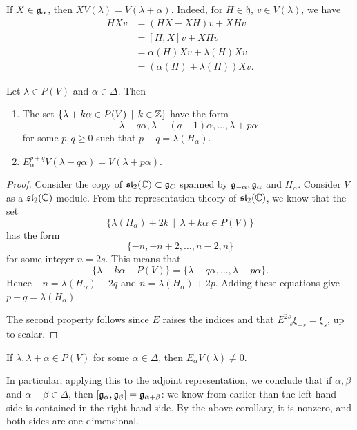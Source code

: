 \documentclass[11pt, english]{article}
\begin{document}
If $X \in \mathfrak g_\alpha$, then $XV(\lambda) = V(\lambda+\alpha)$. Indeed, for $H \in \mathfrak h$, $v \in V(\lambda)$, we have
\begin{align*}
 HXv &= (HX-XH)v+XHv \\
&= [H,X]v + XHv \\
&= \alpha(H)Xv + \lambda(H)Xv \\
&= (\alpha(H)+\lambda(H))Xv.
\end{align*}
\begin{prop}
 Let $\lambda \in P(V)$ and $\alpha \in \Delta$. Then
 \begin{enumerate}
 \item The set $\{ \lambda + k \alpha \in P(V) \, \mid \, k \in \mathbb{Z} \}$ have the form
$$
\lambda-q\alpha, \lambda-(q-1)\alpha,\ldots, \lambda+p\alpha
$$
for some $p,q \geq 0$ such that $p-q=\lambda(H_\alpha)$. 
\item $E_\alpha^{p+q} V(\lambda-q\alpha) = V(\lambda + p\alpha)$.
 \end{enumerate}
\end{prop}
\begin{proof}
  Consider the copy of $\mathfrak{sl}_2(\mathbb{C}) \subset \mathfrak g_C$ spanned by $\mathfrak g_{-\alpha},\mathfrak g_\alpha$ and $H_\alpha$. Consider $V$ as a $\mathfrak{sl}_2(\mathbb{C})$-module. From the representation theory of $\mathfrak{sl}_2(\mathbb{C})$, we know that the set 
$$
\{
\lambda(H_\alpha) + 2k \, \mid \, \lambda+k\alpha \in P(V) 
\}
$$
has the form 
$$
\{-n, -n+2, \ldots, n-2, n \}
$$
for some integer $n=2s$. This means that
$$
\{ \lambda  + k \alpha \, \mid \, P(V) \} = \{ \lambda - q\alpha, \ldots, \lambda+p\alpha \}.
$$
Hence $-n=\lambda(H_\alpha)-2q$ and $n=\lambda(H_\alpha)+2p$. Adding these equations give $p-q=\lambda(H_\alpha)$. 

The second property follows since $E$ raises the indices and that $E^{2s}_{-s} \xi_{-s}= \xi_s$, up to scalar.
\end{proof}

\begin{corr}
  If $\lambda, \lambda+\alpha \in P(V)$ for some $\alpha \in \Delta$, then $E_\alpha V(\lambda) \neq 0$. 
\end{corr}

In particular, applying this to the adjoint representation, we conclude that if $\alpha,\beta$ and $\alpha+\beta \in \Delta$, then $[\mathfrak g_\alpha,\mathfrak g_\beta] = \mathfrak g_{\alpha+\beta}$: we know from earlier than the left-hand-side is contained in the right-hand-side. By the above corollary, it is nonzero, and both sides are one-dimensional.
\end{document}
